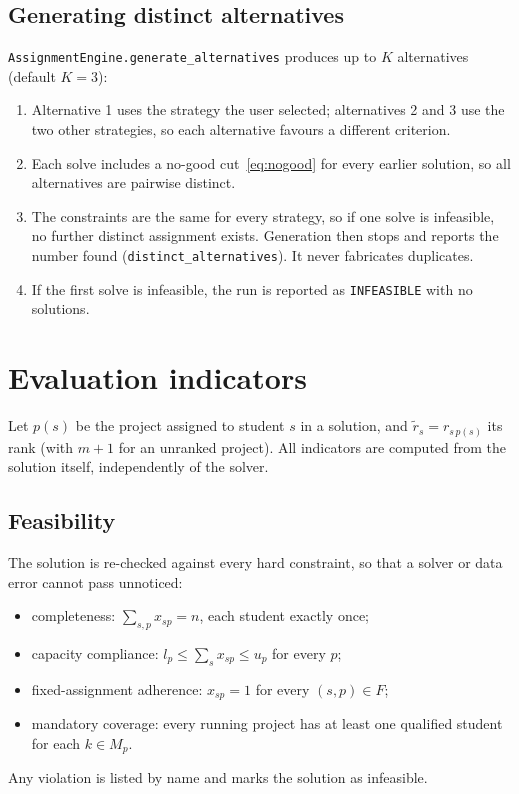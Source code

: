 \documentclass[11pt,a4paper]{article}
\newcommand{\code}[1]{\texttt{#1}}
\begin{document}
\subsection{Generating distinct alternatives}

\code{AssignmentEngine.generate\_alternatives} produces up to $K$ alternatives
(default $K = 3$):
\begin{enumerate}
  \item Alternative 1 uses the strategy the user selected; alternatives 2 and
        3 use the two other strategies, so each alternative favours a
        different criterion.
  \item Each solve includes a no-good cut~\eqref{eq:nogood} for every earlier
        solution, so all alternatives are pairwise distinct.
  \item The constraints are the same for every strategy, so if one solve is
        infeasible, no further distinct assignment exists. Generation then
        stops and reports the number found (\code{distinct\_alternatives}).
        It never fabricates duplicates.
  \item If the first solve is infeasible, the run is reported as
        \code{INFEASIBLE} with no solutions.
\end{enumerate}

\section{Evaluation indicators}
\label{sec:ind}

Let $p(s)$ be the project assigned to student $s$ in a solution, and
$\tilde r_s = r_{s\,p(s)}$ its rank (with $m+1$ for an unranked project). All
indicators are computed from the solution itself, independently of the solver.

\subsection{Feasibility}
The solution is re-checked against every hard constraint, so that a solver or
data error cannot pass unnoticed:
\begin{itemize}
  \item completeness: $\sum_{s,p} x_{sp} = n$, each student exactly once;
  \item capacity compliance: $l_p \le \sum_s x_{sp} \le u_p$ for every $p$;
  \item fixed-assignment adherence: $x_{sp} = 1$ for every $(s,p) \in F$;
  \item mandatory coverage: every running project has at least one qualified
        student for each $k \in M_p$.
\end{itemize}
Any violation is listed by name and marks the solution as infeasible.
\end{document}

